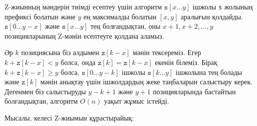 
Z-жиынның мәндерін тиімді есептеу үшін 
алгоритм $\texttt{s}[x \ldots y]$ ішжолы \texttt{s} жолының 
префиксі болатын және $y$ ең максималды болатын
$[x,y]$ аралығын қолдайды. 
$\texttt{s}[0 \ldots y-x]$ және $\texttt{s}[x \ldots y]$
тең болғандықтан, оны $x+1,x+2,\ldots,y$ позицияларының
Z-мәнін есептеуге қолдана аламыз. 


Әр $k$ позициясына біз алдымен 
$\texttt{z}[k-x]$ мәнін тексереміз.
Егер $k+\texttt{z}[k-x]<y$ болса, онда 
$\texttt{z}[k]=\texttt{z}[k-x]$ екенін білеміз. 
Бірақ $k+\texttt{z}[k-x] \ge y$ болса, 
$\texttt{s}[0 \ldots y-k]$ ішжолы
$\texttt{s}[k \ldots y]$ ішжолына тең болады
және $\texttt{z}[k]$ мәнін анықтау үшін 
ішжолдардың жеке таңбаларын салыстыру керек. 
Дегенмен біз салыстыруды $y-k+1$ және $y+1$ 
позицияларында бастайтын болғандықтан, алгоритм $O(n)$ уақыт жұмыс істейді.


Мысалы, келесі Z-жиымын құрастырайық:


